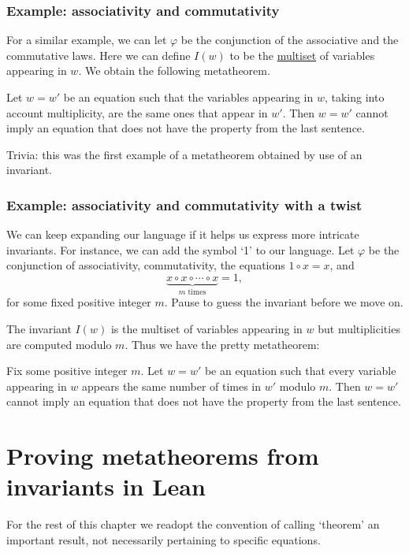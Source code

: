 \subsubsection*{Example: associativity and commutativity}
For a similar example, we can let $\varphi$ be the conjunction of the associative and the commutative laws. Here we can define $I(w)$ to be the \href{https://en.wikipedia.org/wiki/Multiset}{multiset} of variables appearing in $w$. We obtain the following metatheorem.

\begin{metatheorem}
	Let $w = w'$ be an equation such that the variables appearing in $w$, taking into account multiplicity, are the same ones that appear in $w'$. Then $w = w'$ cannot imply an equation that does not have the property from the last sentence.
\end{metatheorem}

Trivia: this was the first example of a metatheorem obtained by use of an invariant.

\subsubsection*{Example: associativity and commutativity with a twist}
We can keep expanding our language if it helps us express more intricate invariants. For instance, we can add the symbol `1' to our language. Let $\varphi$ be the conjunction of associativity, commutativity, the equations $1 \circ x = x$, and
\[
\underbrace{x \circ x \circ \cdots \circ x}_{m\text{ times}} = 1,
\]
for some fixed positive integer $m$. Pause to guess the invariant before we move on.

The invariant $I(w)$ is the multiset of variables appearing in $w$ but multiplicities are computed modulo $m$. Thus we have the pretty metatheorem:
\begin{metatheorem}
	Fix some positive integer $m$. Let $w = w'$ be an equation such that every variable appearing in $w$ appears the same number of times in $w'$ modulo $m$. Then $w = w'$ cannot imply an equation that does not have the property from the last sentence.
\end{metatheorem}

\section{Proving metatheorems from invariants in Lean}

For the rest of this chapter we readopt the convention of calling `theorem' an important result, not necessarily pertaining to specific equations.

